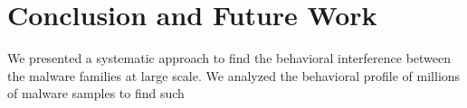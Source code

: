 \chapter{Conclusion and Future Work}\label{chapter:conclusion_and_future_work}
We presented a systematic approach to find the behavioral interference between the malware families at large scale.
We analyzed the behavioral profile of millions of malware samples to find such 
